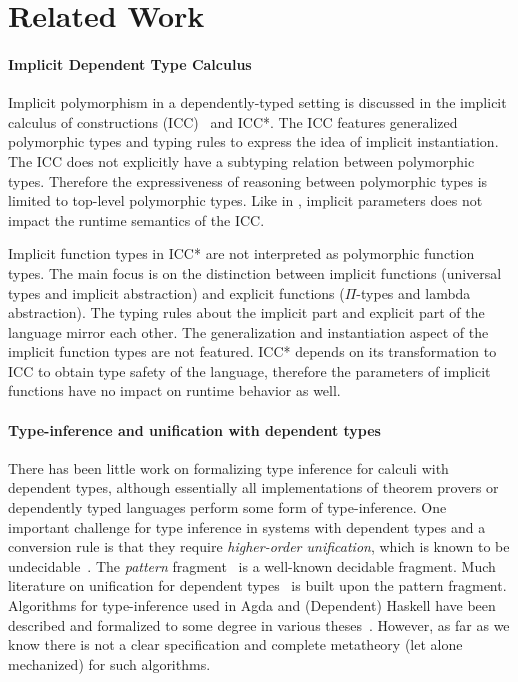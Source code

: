 \section{Related Work}

\paragraph{Implicit Dependent Type Calculus}
Implicit polymorphism in a dependently-typed
setting is discussed in the implicit calculus of constructions (ICC)~\citep{miquel2001implicit} and
ICC*\citep{barras2008implicit}. The ICC features generalized polymorphic types and typing rules to express
the idea of implicit instantiation. The ICC does not explicitly have a subtyping
relation between polymorphic types. Therefore the expressiveness of reasoning
between polymorphic types is limited to top-level polymorphic types. Like
in \name, implicit parameters does not impact the runtime semantics of the ICC.

Implicit function types in ICC* are not interpreted as polymorphic
function types. The main focus is on the distinction between implicit
functions (universal types and implicit abstraction) and explicit functions
($\Pi$-types and lambda abstraction).
The typing rules about the implicit part and explicit part of the language mirror
each other. The generalization and instantiation aspect of the implicit function
types are not featured. ICC* depends on its transformation to ICC to obtain type safety
of the language, therefore the parameters of implicit functions have no impact
on runtime behavior as well.

\paragraph{Type-inference and unification with dependent types}
There has been little work on formalizing type inference for calculi
with dependent types, although essentially all implementations of
theorem provers or dependently typed languages perform some form of
type-inference.
One important challenge for type inference in
systems with dependent types and a conversion rule
is that they require \emph{higher-order unification},
which is known to be undecidable~\citep{goldfarb1981undecidability}. The \textit{pattern}
fragment~\citep{miller1991unification} is a well-known decidable
fragment. Much literature on unification for dependent
types~\citep{reed2009higher,abel2011higher, gundry2013tutorial, Cockx:2016:UEP:2951913.2951917, ziliani2015unification, coen2004mathematical} is
built upon the pattern fragment. Algorithms for type-inference used in Agda and
(Dependent) Haskell have been described and formalized to some degree
in various theses~\citep{norell,gundry,dh}. However, as far as we know
there is not a clear specification and complete metatheory (let alone
mechanized) for such algorithms.

